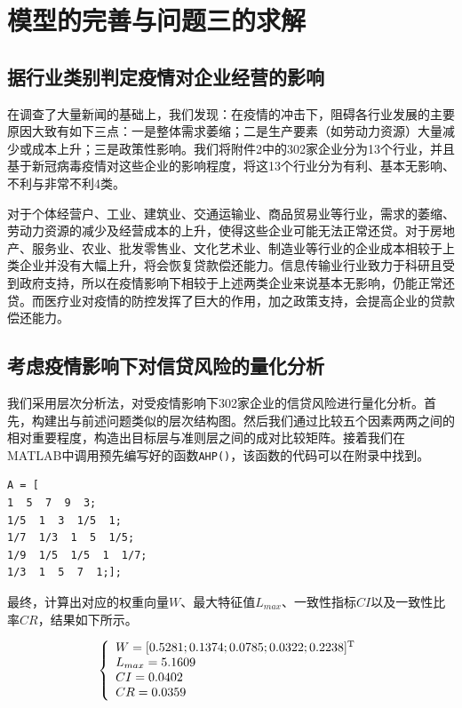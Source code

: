 \ifx\allfiles\undefined


\else
\fi


\section{模型的完善与问题三的求解}
\subsection{据行业类别判定疫情对企业经营的影响}
在调查了大量新闻\cite{ref3}的基础上，我们发现：在疫情的冲击下，阻碍各行业发展的主要原因大致有如下三点：一是整体需求萎缩；二是生产要素（如劳动力资源）大量减少或成本上升；三是政策性影响。我们将附件2中的302家企业分为13个行业，并且基于新冠病毒疫情对这些企业的影响程度，将这13个行业分为有利、基本无影响、不利与非常不利4类。

对于个体经营户、工业、建筑业、交通运输业、商品贸易业等行业，需求的萎缩、劳动力资源的减少及经营成本的上升，使得这些企业可能无法正常还贷。对于房地产、服务业、农业、批发零售业、文化艺术业、制造业等行业的企业成本相较于上类企业并没有大幅上升，将会恢复贷款偿还能力。信息传输业行业致力于科研且受到政府支持，所以在疫情影响下相较于上述两类企业来说基本无影响，仍能正常还贷。而医疗业对疫情的防控发挥了巨大的作用，加之政策支持，会提高企业的贷款偿还能力。



\subsection{考虑疫情影响下对信贷风险的量化分析}

我们采用层次分析法\cite{ref1}，对受疫情影响下302家企业的信贷风险进行量化分析。首先，构建出与前述问题类似的层次结构图。然后我们通过比较五个因素两两之间的相对重要程度，构造出目标层与准则层之间的成对比较矩阵。接着我们在MATLAB中调用预先编写好的函数\verb|AHP()|，该函数的代码可以在附录中找到。

\begin{tcolorbox}[breakable]
	\begin{verbatim}
A = [
1  5  7  9  3;
1/5  1  3  1/5  1;
1/7  1/3  1  5  1/5;
1/9	 1/5  1/5  1  1/7;
1/3  1  5  7  1;];
	\end{verbatim}
\end{tcolorbox}

最终，计算出对应的权重向量$ W $、最大特征值$ L_{max} $、一致性指标$ CI $以及一致性比率$ CR $，结果如下所示。

\[\left\{ \begin{array}{l}
		W = {[0.5281;0.1374;0.0785;0.0322;0.2238]^{\rm{T}}} \\
		{L_{max}} = 5.1609                                  \\
		CI = 0.0402                                         \\
		CR = 0.0359
	\end{array} \right.\]

